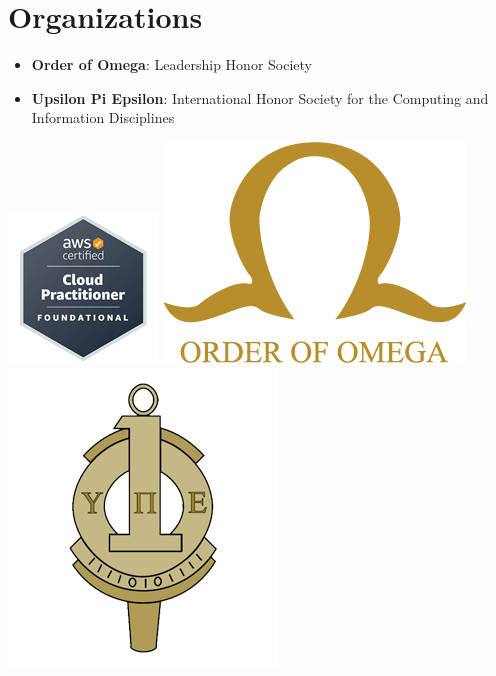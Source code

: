 \documentclass[letterpaper,]{article}
\newcommand{\resumeItem}[2]{
  \item\small{
    \textbf{#1}{: #2 \vspace{-2pt}}
  }
}
\newcommand{\resumeSubItem}[2]{\resumeItem{#1}{#2}\vspace{-4pt}}
\newcommand{\resumeSubHeadingListStart}{\begin{itemize}[leftmargin=*]}
\newcommand{\resumeSubHeadingListEnd}{\end{itemize}}
\begin{document}
\section{Organizations}
  \resumeSubHeadingListStart

    \resumeSubItem{Order of Omega}
      {Leadership Honor Society}

    \resumeSubItem{Upsilon Pi Epsilon}
      {International Honor Society for the Computing and Information Disciplines}

  \resumeSubHeadingListEnd

\begin{center}
    \href{https://cp.certmetrics.com/amazon/en/public/verify/credential/TG78JJ42WNQ41G35}{\includegraphics[scale=0.2]{AWS-Certified-Cloud-Practitioner_badge.png}}
    \href{https://orderofomega.org/}{\includegraphics[scale=0.12]{order_of_omega.png}}
    \href{https://upe.acm.org/}{\includegraphics[scale=0.11]{upsilon_pi_epsilon.png}}
\end{center}

\end{document}
